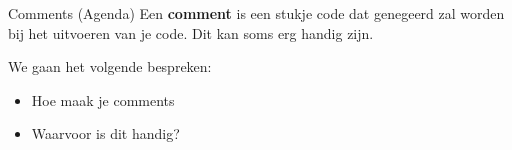 \begin{frame}[fragile]{Comments (Agenda)}
    Een \textbf{comment} is een stukje code dat genegeerd zal worden bij het uitvoeren van je code. 
    Dit kan soms erg handig zijn. 

    We gaan het volgende bespreken:
    \begin{itemize}[label={\textbullet}]
        \pause
        \item Hoe maak je comments 
        \pause
        \item Waarvoor is dit handig?
    \end{itemize}
\end{frame}